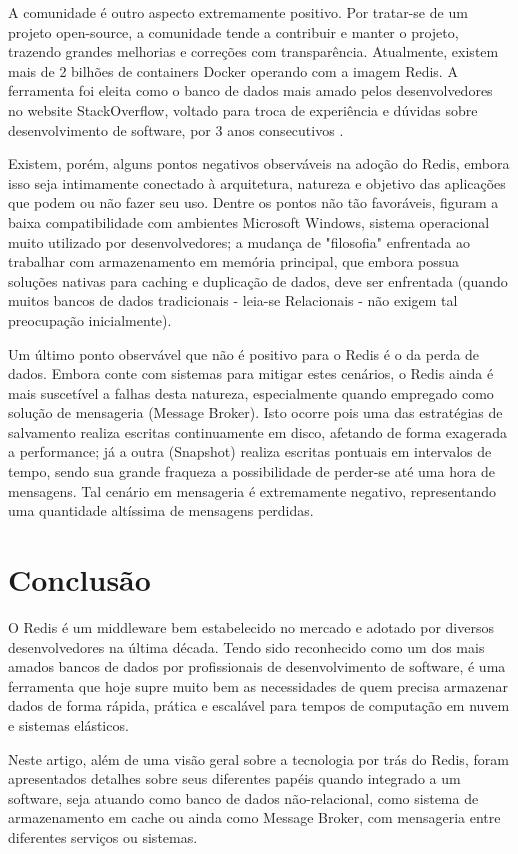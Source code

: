\documentclass[12pt]{article}
\begin{document}
A comunidade é outro aspecto extremamente positivo. Por tratar-se de um projeto open-source, a comunidade tende a contribuir e manter o projeto, trazendo grandes melhorias e correções com transparência. Atualmente, existem mais de 2 bilhões de containers Docker operando com a imagem Redis. A ferramenta foi eleita como o banco de dados mais amado pelos desenvolvedores no website StackOverflow, voltado para troca de experiência e dúvidas sobre desenvolvimento de software, por 3 anos consecutivos \cite{redislabs2020}.

Existem, porém, alguns pontos negativos observáveis na adoção do Redis, embora isso seja intimamente conectado à arquitetura, natureza e objetivo das aplicações que podem ou não fazer seu uso. Dentre os pontos não tão favoráveis, figuram a baixa compatibilidade com ambientes Microsoft Windows, sistema operacional muito utilizado por desenvolvedores; a mudança de "filosofia" enfrentada ao trabalhar com armazenamento em memória principal, que embora possua soluções nativas para caching e duplicação de dados, deve ser enfrentada (quando muitos bancos de dados tradicionais - leia-se Relacionais - não exigem tal preocupação inicialmente).

Um último ponto observável que não é positivo para o Redis é o da perda de dados. Embora conte com sistemas para mitigar estes cenários, o Redis ainda é mais suscetível a falhas desta natureza, especialmente quando empregado como solução de mensageria (Message Broker). Isto ocorre pois uma das estratégias de salvamento realiza escritas continuamente em disco, afetando de forma exagerada a performance; já a outra (Snapshot) realiza escritas pontuais em intervalos de tempo, sendo sua grande fraqueza a possibilidade de perder-se até uma hora de mensagens. Tal cenário em mensageria é extremamente negativo, representando uma quantidade altíssima de mensagens perdidas.

\section{Conclusão}
O Redis é um middleware bem estabelecido no mercado e adotado por diversos desenvolvedores na última década. Tendo sido reconhecido como um dos mais amados bancos de dados por profissionais de desenvolvimento de software, é uma ferramenta que hoje supre muito bem as necessidades de quem precisa armazenar dados de forma rápida, prática e escalável para tempos de computação em nuvem e sistemas elásticos.

Neste artigo, além de uma visão geral sobre a tecnologia por trás do Redis, foram apresentados detalhes sobre seus diferentes papéis quando integrado a um software, seja atuando como banco de dados não-relacional, como sistema de armazenamento em cache ou ainda como Message Broker, com mensageria entre diferentes serviços ou sistemas.
\end{document}
